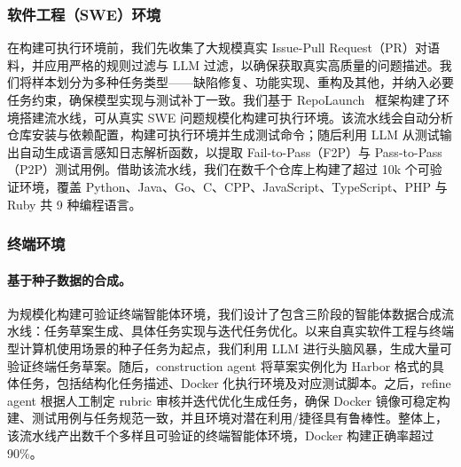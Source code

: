 \subsubsection{软件工程（SWE）环境} 
在构建可执行环境前，我们先收集了大规模真实 Issue-Pull Request（PR）对语料，并应用严格的规则过滤与 LLM 过滤，以确保获取真实高质量的问题描述。我们将样本划分为多种任务类型——缺陷修复、功能实现、重构及其他，并纳入必要任务约束，确保模型实现与测试补丁一致。我们基于 RepoLaunch~\citep{zhang2025swebenchgoeslive} 框架构建了环境搭建流水线，可从真实 SWE 问题规模化构建可执行环境。该流水线会自动分析仓库安装与依赖配置，构建可执行环境并生成测试命令；随后利用 LLM 从测试输出自动生成语言感知日志解析函数，以提取 Fail-to-Pass（F2P）与 Pass-to-Pass（P2P）测试用例。借助该流水线，我们在数千个仓库上构建了超过 10k 个可验证环境，覆盖 Python、Java、Go、C、CPP、JavaScript、TypeScript、PHP 与 Ruby 共 9 种编程语言。

\subsubsection{终端环境} 

\paragraph{基于种子数据的合成。} 为规模化构建可验证终端智能体环境，我们设计了包含三阶段的智能体数据合成流水线：任务草案生成、具体任务实现与迭代任务优化。以来自真实软件工程与终端型计算机使用场景的种子任务为起点，我们利用 LLM 进行头脑风暴，生成大量可验证终端任务草案。随后，construction agent 将草案实例化为 Harbor \cite{harborframeworkteam2026harborframework} 格式的具体任务，包括结构化任务描述、Docker 化执行环境及对应测试脚本。之后，refine agent 根据人工制定 rubric 审核并迭代优化生成任务，确保 Docker 镜像可稳定构建、测试用例与任务规范一致，并且环境对潜在利用/捷径具有鲁棒性。整体上，该流水线产出数千个多样且可验证的终端智能体环境，Docker 构建正确率超过 90\%。



